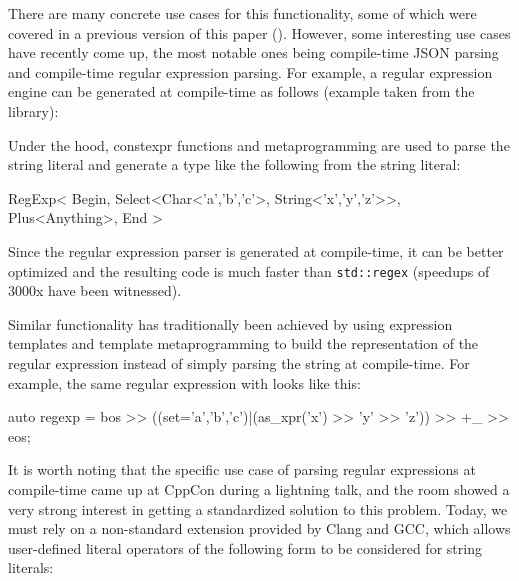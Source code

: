 \documentclass{wg21}
\newcommand{\cc}[1]{\texttt{#1}}
\begin{document}
There are many concrete use cases for this functionality, some of which were
covered in a previous version of this paper (\cite{P0424R0}). However, some
interesting use cases have recently come up, the most notable ones being
compile-time JSON parsing and compile-time regular expression parsing. For
example, a regular expression engine can be generated at compile-time as
follows (example taken from the \cite{CTRE} library):


Under the hood, constexpr functions and metaprogramming are used to parse the
string literal and generate a type like the following from the string literal:

\begin{cpp}
RegExp<
  Begin,
  Select<Char<'a','b','c'>, String<'x','y','z'>>,
  Plus<Anything>,
  End
>
\end{cpp}

Since the regular expression parser is generated at compile-time, it can be
better optimized and the resulting code is much faster than \cc{std::regex}
(speedups of 3000x have been witnessed).

Similar functionality has traditionally been achieved by using expression
templates and template metaprogramming to build the representation of the
regular expression instead of simply parsing the string at compile-time.
For example, the same regular expression with \cite{Boost.Xpressive} looks
like this:

\begin{cpp}
auto regexp = bos >> ((set='a','b','c')|(as_xpr('x') >> 'y' >> 'z')) >> +_ >> eos;
\end{cpp}

It is worth noting that the specific use case of parsing regular expressions
at compile-time came up at CppCon during a lightning talk, and the room showed
a very strong interest in getting a standardized solution to this problem.
Today, we must rely on a non-standard extension provided by Clang and GCC,
which allows user-defined literal operators of the following form to be
considered for string literals:
\end{document}
